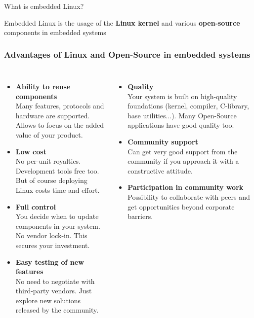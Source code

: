 \begin{frame}{What is embedded Linux?}
  \huge
  \begin{center}
    Embedded Linux is the usage of the {\bf Linux kernel} and various
    {\bf open-source} components in embedded systems
  \end{center}
\end{frame}

\begin{frame}
  \frametitle{Advantages of Linux and Open-Source in embedded systems}
  \small
  \begin{columns}
     \begin{itemize}
     \item {\bf Ability to reuse components}\\
           Many features, protocols and hardware are supported.
           Allows to focus on the added value of your product.
     \item {\bf Low cost}\\
           No per-unit royalties. Development tools free
	   too. But of course deploying Linux costs time and effort.
     \item {\bf Full control}\\
           You decide when to update components in your
	   system. No vendor lock-in. This secures your investment.
     \item {\bf Easy testing of new features}\\
           No need to negotiate with third-party vendors. Just explore
	   new solutions released by the community.
     \end{itemize}
     \begin{itemize}
     \item {\bf Quality}\\
           Your system is built on high-quality foundations
           (kernel, compiler, C-library, base utilities...). Many
           Open-Source applications have good quality too.
     \item {\bf Community support}\\
           Can get very good support from the
	   community if you approach it with a constructive attitude.
     \item {\bf Participation in community work}\\
	   Possibility to collaborate with peers and get opportunities
           beyond corporate barriers.
     \end{itemize}
  \end{columns}
\end{frame}

